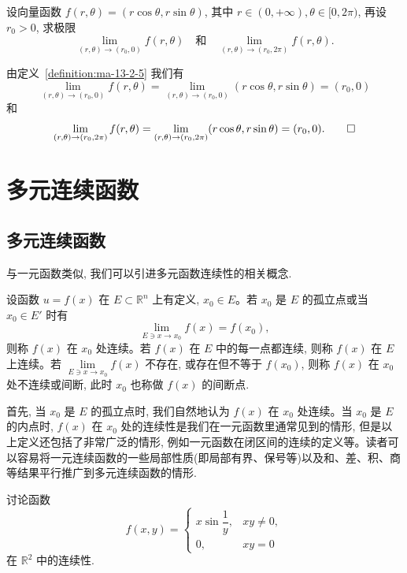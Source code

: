 \begin{example}\label{example:ma-13-2-6}
设向量函数 $f(r,\theta)=(r\cos\theta,r\sin\theta)$, 其中 $r\in(0,+\infty),\theta\in[0,2\pi)$, 再设 $r_0>0$, 求极限
\[
  \lim_{(r,\theta)\to(r_0,0)}f(r,\theta)
  \quad\text{和}\quad
  \lim_{(r,\theta)\to(r_0,2\pi)}f(r,\theta).
\]
\end{example}


\begin{solve}
由定义~\ref{definition:ma-13-2-5} 我们有
\[
  \lim_{(r,\theta)\to(r_0,0)}f(r,\theta)
  =\lim_{(r,\theta)\to(r_0,0)}(r\cos\theta,r\sin\theta)=(r_0,0)
\]
和
\[
  \lim_{(r,\theta)\to(r_0,2\pi)}f(r,\theta)
  =\lim_{(r,\theta)\to(r_0,2\pi)}(r\cos\theta,r\sin\theta)=(r_0,0).
\qedhere
\]
\end{solve}


\section{多元连续函数}
\label{sec:ma-13-3}

\subsection{多元连续函数}
\label{subsec:ma-13-3-1}

与一元函数类似, 我们可以引进多元函数连续性的相关概念.

\begin{definition}\label{definition:ma-13-3-1}
设函数 $u=f(x)$ 在 $E\subset\mathbb R^n$ 上有定义, $x_0\in E$。若 $x_0$ 是 $E$ 的孤立点或当 $x_0\in E'$ 时有
\[
  \lim_{E\ni x\to x_0}f(x)=f(x_0),
\]
则称 $f(x)$ 在 $x_0$ 处连续。若 $f(x)$ 在 $E$ 中的每一点都连续, 则称 $f(x)$ 在 $E$ 上连续。若 $\lim\limits_{E\ni x\to x_0}f(x)$ 不存在, 或存在但不等于 $f(x_0)$, 则称 $f(x)$ 在 $x_0$ 处不连续或间断, 此时 $x_0$ 也称做 $f(x)$ 的间断点.
\end{definition}

首先, 当 $x_0$ 是 $E$ 的孤立点时, 我们自然地认为 $f(x)$ 在 $x_0$ 处连续。当 $x_0$ 是 $E$ 的内点时, $f(x)$ 在 $x_0$ 处的连续性是我们在一元函数里通常见到的情形, 但是以上定义还包括了非常广泛的情形, 例如一元函数在闭区间的连续的定义等。读者可以容易将一元连续函数的一些局部性质(即局部有界、保号等)以及和、差、积、商等结果平行推广到多元连续函数的情形.

\begin{example}\label{example:ma-13-3-1}
讨论函数
\[
  f(x,y)=
  \begin{cases}
    x\sin\dfrac1y, & xy\ne0,\\
    0, & xy=0
  \end{cases}
\]
在 $\mathbb R^2$ 中的连续性.
\end{example}


